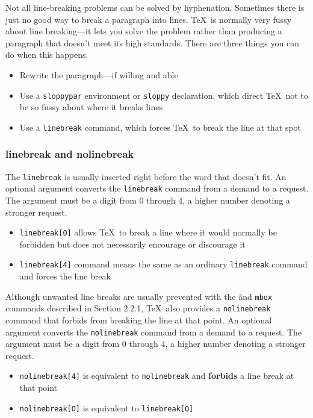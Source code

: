 \documentclass{article}
\begin{document}
Not all line-breaking problems can be solved by hyphenation. Sometimes there is just no good way to
break a paragraph into lines. \TeX\ is normally very fussy about line breaking---it lets you solve
the problem rather than producing a paragraph that doesn't meet its high standards. There are three
things you can do when this happens.

\begin{itemize}
   \item Rewrite the paragraph---if willing and able
   \item Use a {\tt sloppypar} environment or \verb:sloppy: declaration, which direct \TeX\ not
    to be so fussy about where it breaks lines
   \item Use a \verb:linebreak: command, which forces \TeX\ to break the line at that spot
\end{itemize}

\subsubsection{linebreak and nolinebreak}

The \verb:linebreak: is usually inserted right before the word that doesn't fit. An optional
argument converts the \verb:linebreak: command from a demand to a request. The argument must be a
digit from 0 through 4, a higher number denoting a stronger request. 

\begin{itemize}
   
   \item \verb:linebreak[O]: allows \TeX\ to break a line where it would normally be forbidden but
    does not necessarily encourage or discourage it
   
   \item \verb:linebreak[4]: command means the same as an ordinary \verb:linebreak: command and
    forces the line break
        
\end{itemize}
 
Although unwanted line breaks are usually prevented with the \~ and \verb:mbox: commands described
in Section 2.2.1, \TeX\ also provides a \verb:nolinebreak: command that forbids from breaking the
line at that point. An optional argument converts the \verb:nolinebreak: command from a demand to a
request. The argument must be a digit from 0 through 4, a higher number denoting a stronger
request.

\begin{itemize}
   
   \item \verb:nolinebreak[4]: is equivalent to \verb:nolinebreak: and \textbf{forbids} a line break
    at that point
   
   \item \verb:nolinebreak[O]: is equivalent to \verb:linebreak[O]:
\end{itemize}
\end{document}
